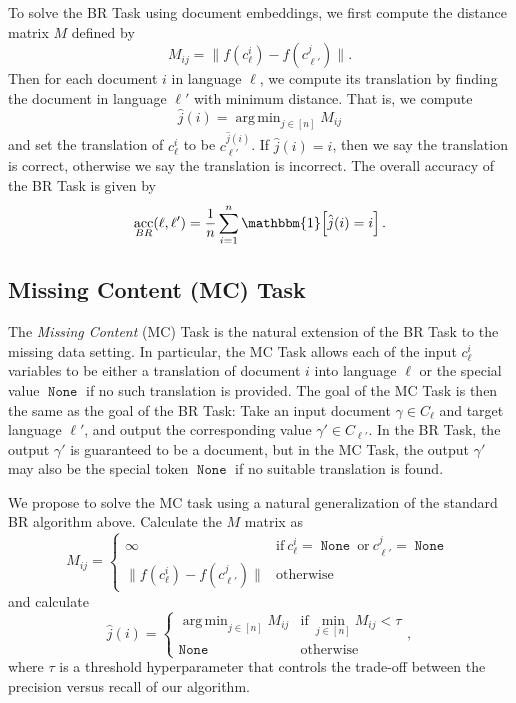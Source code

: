 \documentclass[11pt]{article}
\newcommand{\ltwo}[1]{\lVert{#1}\rVert}
\newcommand{\indicator}[1]{\mathbbm{1}\!\left[{#1}\right]}
\newcommand{\defn}[1]{\emph{{#1}}}
\DeclareMathOperator*{\argmin}{arg\,min}
\DeclareMathOperator{\acc}{acc}
\DeclareMathOperator{\none}{\texttt{None}}
\begin{document}
To solve the BR Task using document embeddings, we first compute the distance matrix $M$ defined by 
\begin{equation}
    \label{eq:M}
    M_{ij} = \ltwo{ f (c_{\ell}^i) - f(c_{\ell'}^j ) }.
\end{equation}
Then for each document $i$ in language $\ell$, we compute its translation by finding the document in language $\ell'$ with minimum distance.
That is, we compute
\begin{equation}
    \label{eq:jhat}
    \hat j(i) = \argmin_{j\in[n]} M_{ij}
\end{equation}
and set the translation of $c_{\ell}^i$ to be $c_{\ell'}^{\hat j(i)}$.
If $\hat j(i) = i$, then we say the translation is correct,
otherwise we say the translation is incorrect.
The overall accuracy of the BR Task is given by
\begin{equation}
    \acc_{BR}(\ell,\ell') = \frac 1 n \sum_{i=1}^n \indicator{\hat j(i) = i}
    .
\end{equation}

\subsection{Missing Content (MC) Task}

The \defn{Missing Content} (MC) Task is the natural extension of the BR Task to the missing data setting.
In particular, the MC Task allows each of the input $c_\ell^i$ variables to be either a translation of document $i$ into language $\ell$ or the special value $\none$ if no such translation is provided.
The goal of the MC Task is then the same as the goal of the BR Task:
Take an input document $\gamma\in C_\ell$ and target language $\ell'$,
and output the corresponding value $\gamma' \in C_{\ell'}$.
In the BR Task, the output $\gamma'$ is guaranteed to be a document,
but in the MC Task, the output $\gamma'$ may also be the special token $\none$ if no suitable translation is found.

We propose to solve the MC task using a natural generalization of the standard BR algorithm above.
Calculate the $M$ matrix as
\begin{equation}
    M_{ij} = 
    \begin{cases}
        \infty & \text{if}~ c_{\ell}^i = \none ~\text{or}~ c_{\ell'}^j=\none \\
        \ltwo{ f (c_{\ell}^i) - f(c_{\ell'}^j ) } & \text{otherwise}
    \end{cases}
\end{equation}
and calculate
\begin{equation}
    \hat j(i) = 
    \begin{cases}
        \argmin_{j\in[n]} M_{ij} & \text{if}~ \min_{j\in[n]} M_{ij} < \tau \\
        \none & \text{otherwise}
    \end{cases}
    ,
\end{equation}
where $\tau$ is a threshold hyperparameter that controls the trade-off between the precision versus recall of our algorithm.
\end{document}
